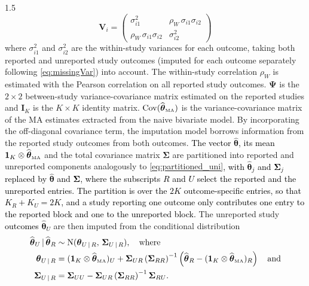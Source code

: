 \documentclass{article}
\newcommand{\mycolor}[1]{\textcolor{black}{#1}}
\begin{document}
\begin{spacing}{1.5}
\begin{equation*} 
\boldsymbol{V}_i = 
 \begin{pmatrix}
\sigma_{i1}^2 & \rho_W \, \sigma_{i1} \sigma_{i2} \\
\rho_W \, \sigma_{i1} \sigma_{i2} & \sigma_{i2}^2
\end{pmatrix} 
\end{equation*}
where $\sigma_{i1}^2$ and $\sigma_{i2}^2$ are the within-study variances for each outcome, taking both reported and unreported study outcomes (imputed for each outcome separately following \eqref{eq:missingVar}) into account. The within-study correlation $\rho_W$ is estimated with the Pearson correlation on all reported study outcomes. $\boldsymbol{\Psi}$ is the $2 \times 2$ between-study variance-covariance matrix estimated on the reported studies and $\boldsymbol{I}_K$ is the $K \times K$ identity matrix.
$\operatorname{Cov}(\widehat{\boldsymbol\theta}_{\tiny{\mbox{MA}}})$ is the variance-covariance matrix of the MA estimates extracted from the naive bivariate model. By incorporating the off-diagonal covariance term, the imputation model borrows information from the reported study outcomes from both outcomes.  \mycolor{The vector $\widehat{\boldsymbol{\theta}}$, its mean $\boldsymbol{1}_K \otimes \widehat{\boldsymbol{\theta}}_{\tiny{\mbox{MA}}}$}
 and the total covariance matrix 
$\boldsymbol{\Sigma}$ are partitioned into reported and unreported components analogously to \eqref{eq:partitioned_uni}\mycolor{, with $\widehat{\boldsymbol{\theta}}_j$  and $\boldsymbol{\Sigma}_j$ replaced by $\widehat{\boldsymbol{\theta}}$ and $\boldsymbol{\Sigma}$, where the subscripts $R$ and $U$ select the reported and the unreported entries. The partition is over the $2K$ outcome-specific entries, so that $K_R + K_U = 2K$, and a study reporting one outcome only contributes one entry to the reported block and one to the unreported block.} The unreported study \mycolor{outcomes $\widehat{\boldsymbol{\theta}}_{U}$} are then imputed from the conditional distribution 
\mycolor{
\begin{align}
\widehat{\boldsymbol{\theta}}_{U} \,\vert\, \widehat{\boldsymbol{\theta}}_{R} 
&\sim \operatorname{N}(\boldsymbol{\theta}_{U \,\vert\, R},\, \boldsymbol{\Sigma}_{U \,\vert\, R}), \quad \text{where} \label{eq:condDistMulti} \\
\boldsymbol{\theta}_{U \,\vert\, R} 
&= (\boldsymbol{1}_{K} \otimes \widehat{\boldsymbol{\theta}}_{\tiny{\mbox{MA}}})_U + \boldsymbol{\Sigma}_{UR} \left( \boldsymbol{\Sigma}_{RR} \right)^{-1} \left( \widehat{\boldsymbol{\theta}}_{R} - (\boldsymbol{1}_{K} \otimes \widehat{\boldsymbol{\theta}}_{\tiny{\mbox{MA}}})_R \right) \quad \text{and} \nonumber \\
\boldsymbol{\Sigma}_{U \,\vert\, R} 
&= \boldsymbol{\Sigma}_{UU} - \boldsymbol{\Sigma}_{UR} \left( \boldsymbol{\Sigma}_{RR} \right)^{-1} \boldsymbol{\Sigma}_{RU}. \nonumber
\end{align}}


\end{spacing}
\end{document}
